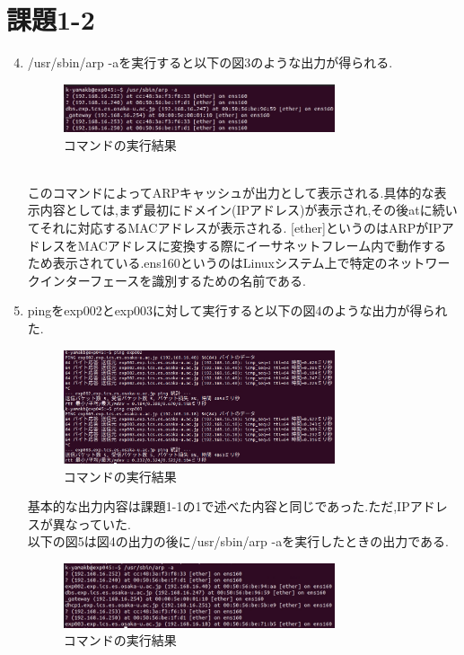 \documentclass[dvipdfmx]{jarticle}
\begin{document}
\section{課題1-2}
\begin{enumerate}
    \setcounter{enumi}{3}
    \item /usr/sbin/arp -aを実行すると以下の図3のような出力が得られる.
    \begin{figure}[h]
        \centering
        \includegraphics[width=8cm]{1-2-4.png}
        \caption{コマンドの実行結果}
    \end{figure}
    \\このコマンドによってARPキャッシュが出力として表示される.具体的な表示内容としては,まず最初にドメイン(IPアドレス)が表示され,その後atに続いてそれに対応するMACアドレスが表示される.
    [ether]というのはARPがIPアドレスをMACアドレスに変換する際にイーサネットフレーム内で動作するため表示されている.ens160というのはLinuxシステム上で特定のネットワークインターフェースを識別するための名前である.
    \item pingをexp002とexp003に対して実行すると以下の図4のような出力が得られた.
    \begin{figure}[h]
        \centering
        \includegraphics[width=8cm]{1-2-5.png}
        \caption{コマンドの実行結果}
    \end{figure}
    基本的な出力内容は課題1-1の1で述べた内容と同じであった.ただ,IPアドレスが異なっていた.
    \\以下の図5は図4の出力の後に/usr/sbin/arp -aを実行したときの出力である.
    \begin{figure}[h]
        \centering
        \includegraphics[width=8cm]{1-2-5-2.png}
        \caption{コマンドの実行結果}
    \end{figure}

\end{enumerate}
\end{document}
